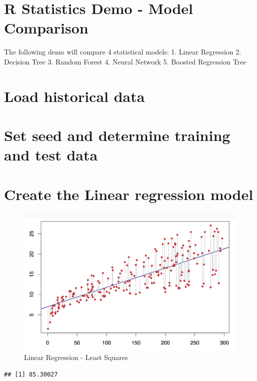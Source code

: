 \documentclass[]{article}
\title{}
\author{}
\date{}
\begin{document}
\section{R Statistics Demo - Model
Comparison}\label{r-statistics-demo---model-comparison}

The following demo will compare 4 statistical models: 1. Linear
Regression 2. Decision Tree 3. Random Forest 4. Neural Network 5.
Boosted Regression Tree

\newpage

\section{Load historical data}\label{load-historical-data}

\section{Set seed and determine training and test
data}\label{set-seed-and-determine-training-and-test-data}

\section{Create the Linear regression
model}\label{create-the-linear-regression-model}

\begin{figure}
\centering
\includegraphics{regression.png}
\caption{Linear Regression - Least Squares}
\end{figure}

\begin{verbatim}
## [1] 85.30027
\end{verbatim}
\end{document}
